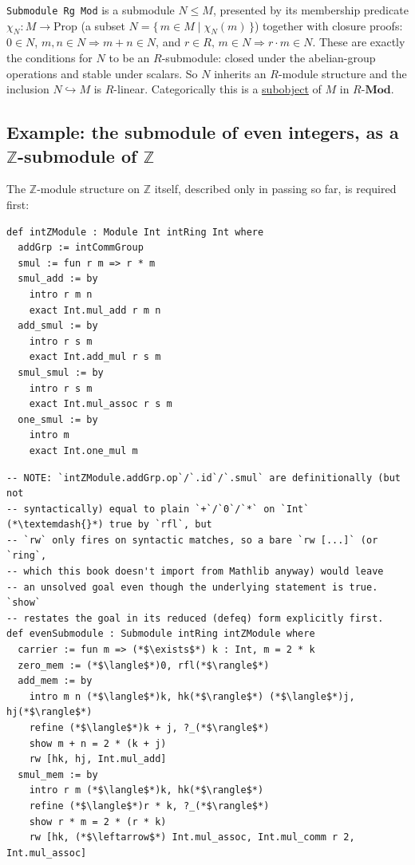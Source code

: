 \begin{mathreading}

\texttt{Submodule Rg Mod} is a submodule \(N \le M\), presented by its membership predicate \(\chi_N : M \to \mathrm{Prop}\) (a subset \(N = \{\,m \in M \mid \chi_N(m)\,\}\)) together with closure proofs: \(0 \in N\), \(m,n \in N \Rightarrow m+n \in N\), and \(r\in R,\, m\in N
\Rightarrow r\cdot m \in N\). These are exactly the conditions for \(N\) to be an \(R\)-submodule: closed under the abelian-group operations and stable under scalars. So \(N\) inherits an \(R\)-module structure and the inclusion \(N \hookrightarrow M\) is \(R\)-linear. Categorically this is a \hyperref[sec:01-basics:04-terminology:1]{subobject} of \(M\) in \(R\text{-}\mathbf{Mod}\).

\end{mathreading}

\subsection{\texorpdfstring{Example: the submodule of even integers, as a \(\mathbb{Z}\)-submodule of \(\mathbb{Z}\)}{Example: the submodule of even integers, as a \textbackslash mathbb\{Z\}-submodule of \textbackslash mathbb\{Z\}}}\label{sec:10-modules:04-submodules:3}

The \(\mathbb{Z}\)-module structure on \(\mathbb{Z}\) itself, described only in passing so far, is required first:

\begin{lstlisting}
def intZModule : Module Int intRing Int where
  addGrp := intCommGroup
  smul := fun r m => r * m
  smul_add := by
    intro r m n
    exact Int.mul_add r m n
  add_smul := by
    intro r s m
    exact Int.add_mul r s m
  smul_smul := by
    intro r s m
    exact Int.mul_assoc r s m
  one_smul := by
    intro m
    exact Int.one_mul m
\end{lstlisting}

\begin{lstlisting}
-- NOTE: `intZModule.addGrp.op`/`.id`/`.smul` are definitionally (but not
-- syntactically) equal to plain `+`/`0`/`*` on `Int` (*\textemdash{}*) true by `rfl`, but
-- `rw` only fires on syntactic matches, so a bare `rw [...]` (or `ring`,
-- which this book doesn't import from Mathlib anyway) would leave
-- an unsolved goal even though the underlying statement is true. `show`
-- restates the goal in its reduced (defeq) form explicitly first.
def evenSubmodule : Submodule intRing intZModule where
  carrier := fun m => (*$\exists$*) k : Int, m = 2 * k
  zero_mem := (*$\langle$*)0, rfl(*$\rangle$*)
  add_mem := by
    intro m n (*$\langle$*)k, hk(*$\rangle$*) (*$\langle$*)j, hj(*$\rangle$*)
    refine (*$\langle$*)k + j, ?_(*$\rangle$*)
    show m + n = 2 * (k + j)
    rw [hk, hj, Int.mul_add]
  smul_mem := by
    intro r m (*$\langle$*)k, hk(*$\rangle$*)
    refine (*$\langle$*)r * k, ?_(*$\rangle$*)
    show r * m = 2 * (r * k)
    rw [hk, (*$\leftarrow$*) Int.mul_assoc, Int.mul_comm r 2, Int.mul_assoc]
\end{lstlisting}

